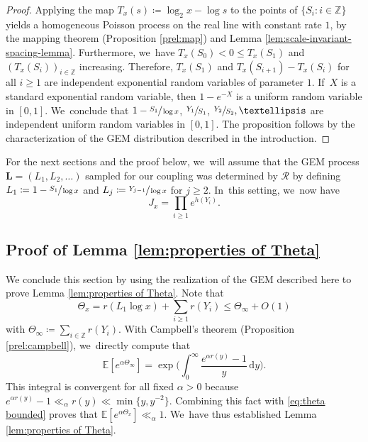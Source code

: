 \documentclass[10pt,a4paper]{amsart}
\newcommand{\bL}{{\boldsymbol L}}
\newcommand{\ZZ}{\mathbb{Z}}
\newcommand{\EE}{\mathbb{E}}
\newcommand{\RS}{\mathscr{R}}
\newcommand{\bggg}{\bigg}
\theoremstyle{plain}
\theoremstyle{definition}
\begin{document}
\begin{proof}
Applying the map $T_x(s) \coloneqq \log_2 x - \log s$ to the points of \hbox{$\{S_i : i \in \ZZ\}$} yields a homogeneous Poisson process on the real line with constant rate $1$, by the mapping theorem (Proposition \ref{prel:map}) and Lemma \ref{lem:scale-invariant-spacing-lemma}. Furthermore, we~have \hbox{$T_x(S_0) \!<\! 0 \!\le\! T_x(S_1)$} and $(T_x(S_i))_{i \in \ZZ}$ increasing. Therefore, $T_x(S_1)$ and \hbox{$T_x(S_{i+1}) \!-\! T_x(S_i)$} for all $i \ge 1$ are independent exponential random variables of parameter $1$. If~$X$ is a standard exponential random variable, then $1-e^{-X}$ is a uniform random variable in $[0, 1]$. We~conclude that $1-\sfrac{S_1}{\log x}$, $\sfrac{Y_1}{S_1}$, $\sfrac{Y_2}{S_2},\dots$ are independent uniform random variables in $[0, 1]$. The proposition follows by the characterization of the GEM distribution described in the introduction.
\end{proof}

For the next sections and the proof below, we~will assume that the GEM process $\bL = (L_1, L_2, \ldots)$ sampled for our coupling was determined by $\RS$ by defining \hbox{$L_1 \coloneqq 1-\sfrac{S_1}{\log x}$} and $L_j \coloneqq \sfrac{Y_{j-1}}{\log x}$ for $j \ge 2$. In~this setting, we~now have
\begin{equation}
\label{eq:J_x alternative definition}
J_x = \prod_{i \ge 1} e^{h(Y_i)}.
\end{equation}

\subsection{Proof of Lemma \ref{lem:properties of Theta}}
We conclude this section by using the realization of the GEM described here to prove Lemma \ref{lem:properties of Theta}. Note that
\begin{equation}
\label{eq:theta bounded}
\Theta_x = r(L_1\log x) + \sum_{i \ge 1} r(Y_i) \le \Theta_\infty + O(1)
\end{equation}
with $\Theta_\infty \coloneqq \sum_{i \in \ZZ} r(Y_i)$. With Campbell's theorem (Proposition \ref{prel:campbell}), we~directly compute that
\begin{equation}
\label{eq:mgf theta infty}
\EE[e^{\alpha \Theta_\infty}] = \exp\!\bggg(\!\int_{0}^\infty \frac{e^{\alpha r(y)} - 1}{y}\, \mathrm dy\bggg).
\end{equation}
This integral is convergent for all fixed $\alpha \!>\! 0$ because $e^{\alpha r(y)} -1 \!\ll_\alpha\! r(y) \!\ll\!\min\{y,y^{-2}\}$. Combining this fact with \eqref{eq:theta bounded} proves that $\EE[e^{\alpha \Theta_x}] \ll_\alpha 1$. We~have thus established Lemma \ref{lem:properties of Theta}.
\end{document}
